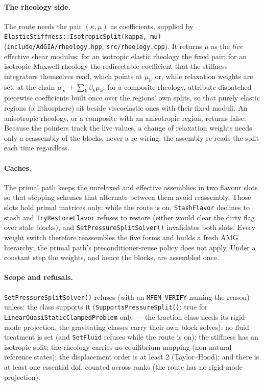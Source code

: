 \documentclass[11pt]{article}
\numberwithin{equation}{section}
\theoremstyle{remark}
\newcommand{\code}[1]{\texttt{#1}}
\begin{document}
\paragraph{The rheology side.} The route needs the pair $(\kappa,\mu)$ as
coefficients, supplied by \code{ElasticStiffness::IsotropicSplit(kappa,
mu)} (\code{include/AdGIA/rheology.hpp}, \code{src/rheology.cpp}). It
returns $\mu$ as the \emph{live} effective shear modulus: for an
isotropic elastic rheology the fixed pair; for an isotropic Maxwell
rheology the redirectable coefficient that the stiffness integrators
themselves read, which points at $\mu_U$ or, while relaxation weights are
set, at the chain $\mu_\infty + \sum_k\beta_k\mu_k$; for a composite
rheology, attribute-dispatched piecewise coefficients built once over the
regions' own splits, so that purely elastic regions (a lithosphere) sit
beside viscoelastic ones with their fixed moduli. An anisotropic rheology,
or a composite with an anisotropic region, returns false. Because the
pointers track the live values, a change of relaxation weights needs only
a reassembly of the blocks, never a re-wiring; the assembly re-reads the
split each time regardless.

\paragraph{Caches.} The primal path keeps the unrelaxed and effective
assemblies in two flavour slots so that stepping schemes that alternate
between them avoid reassembly. Those slots hold primal matrices only: while
the route is on, \code{StashFlavor} declines to stash and
\code{TryRestoreFlavor} refuses to restore (either would clear the dirty
flag over stale blocks), and \code{SetPressureSplitSolver()} invalidates
both slots. Every weight switch therefore reassembles the five forms and
builds a fresh AMG hierarchy; the primal path's preconditioner-reuse
policy does not apply. Under a constant step the weights, and hence the
blocks, are assembled once.

\paragraph{Scope and refusals.} \code{SetPressureSplitSolver()} refuses
(with an \code{MFEM\_VERIFY} naming the reason) unless:
the class supports it (\code{SupportsPressureSplit()}: true for
\code{LinearQuasiStaticClampedProblem} only --- the traction class needs
its rigid-mode projection, the gravitating classes carry their own block
solves); no fluid treatment is set (and \code{SetFluid} refuses while the
route is on); the stiffness has an isotropic split; the rheology carries
no equilibrium mapping (non-natural reference states); the displacement
order is at least 2 (Taylor--Hood); and there is at least one essential
dof, counted across ranks (the route has no rigid-mode projection).
\end{document}
